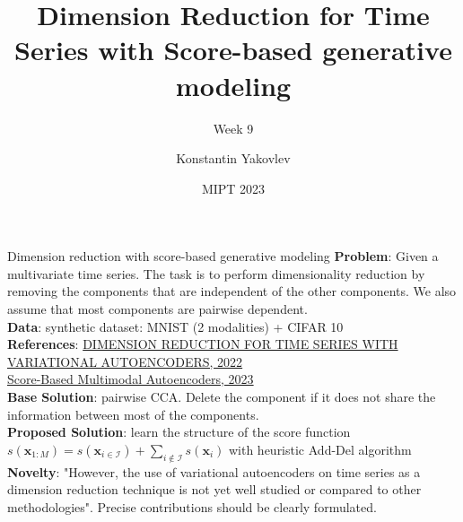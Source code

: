 \documentclass[aspectratio=169]{beamer}
\title[Week 1]
{Dimension Reduction for Time Series with Score-based generative modeling}
\subtitle{Week 9}
\author[] %
{
Konstantin Yakovlev \inst{1} \and
}
\institute[] %
{
  \inst{1}%
  MIPT \\
  Moscow, Russia
}
\date[MIPT 2023] %
{MIPT 2023}
\begin{document}
\frame{\titlepage}

\begin{frame}{Dimension reduction with score-based generative modeling}
    \textbf{Problem}: Given a multivariate time series. The task is to perform dimensionality reduction
    by removing the components that are independent of the other components. We also assume that most components
    are pairwise dependent. \\
    \textbf{Data}: synthetic dataset: MNIST (2 modalities) + CIFAR 10 \\
    \textbf{References}: \href{https://arxiv.org/pdf/2204.11060.pdf}{DIMENSION REDUCTION FOR TIME SERIES WITH VARIATIONAL AUTOENCODERS, 2022} \\
    \href{https://arxiv.org/abs/2305.15708}{Score-Based Multimodal Autoencoders, 2023} \\
    \textbf{Base Solution}: pairwise CCA. Delete the component if it does not share the information between most of the components. \\
    \textbf{Proposed Solution}: learn the structure of the score function $s(\mathbf{x}_{1:M}) = s(\mathbf{x}_{i \in \mathcal{I}}) + \sum_{i \not\in \mathcal{I}}s(\mathbf{x}_i)$
    with heuristic Add-Del algorithm \\
    \textbf{Novelty}: "However, the use of variational autoencoders on time series as a dimension reduction technique is not yet well studied or compared to other methodologies".
    Precise contributions should be clearly formulated.
    
\end{frame}
\end{document}
